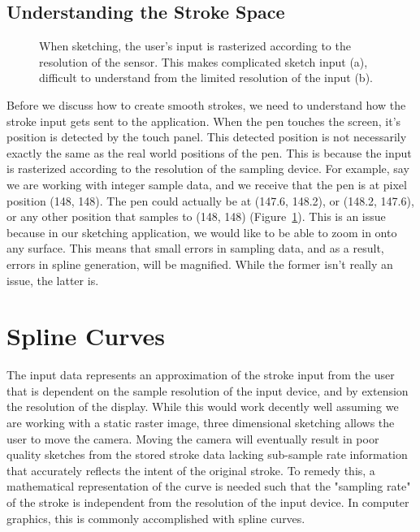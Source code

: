 \subsection{Understanding the Stroke Space}
\label{sec:samplespace}

\begin{figure}
\label{fig:samplestroke}
\centering  
{}
\caption[Sketch intent versus sketch input]{When sketching, the user's input is rasterized according to the resolution of the sensor. This makes complicated sketch input (a), difficult to understand from the limited resolution of the input (b).}
\end{figure}

Before we discuss how to create smooth strokes, we need to understand how the stroke input gets sent to the application.
When the pen touches the screen, it's position is detected by the touch panel.
This detected position is not necessarily exactly the same as the real world positions of the pen.
This is because the input is rasterized according to the resolution of the sampling device.
For example, say we are working with integer sample data, and we receive that the pen is at pixel position (148, 148).
The pen could actually be at (147.6, 148.2), or (148.2, 147.6), or any other position that samples to (148, 148) (Figure~\ref{fig:samplestroke}).
This is an issue because in our sketching application, we would like to be able to zoom in onto any surface.
This means that small errors in sampling data, and as a result, errors in spline generation, will be magnified.
While the former isn't really an issue, the latter is.


\section{Spline Curves}
\label{sec:splines}

The input data represents an approximation of the stroke input from the user that is dependent on the sample resolution of the input device, and by extension the resolution of the display.
While this would work decently well assuming we are working with a static raster image, three dimensional sketching allows the user to move the camera.
Moving the camera will eventually result in poor quality sketches from the stored stroke data lacking sub-sample rate information that accurately reflects the intent of the original stroke.
To remedy this, a mathematical representation of the curve is needed such that the "sampling rate" of the stroke is independent from the resolution of the input device.
In computer graphics, this is commonly accomplished with spline curves.


